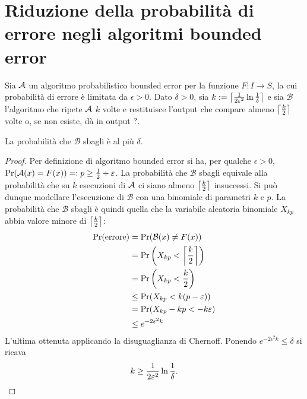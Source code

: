 %
%
%
%


\section{Riduzione della probabilità di errore negli algoritmi bounded error}
\newcommand{\Balg}{\mathcal B}

Sia $\Aalg$ un algoritmo probabilistico bounded error per la funzione $F:I\to S$, la cui probabilità di errore è limitata da $\epsilon>0$.
Dato $\delta>0$, sia $k:=\ceil{\frac{1}{2\epsilon^2}\ln\frac{1}{\delta}}$ e sia $\Balg$ l'algoritmo che ripete $\Aalg$ $k$ volte e restituisce l'output che compare almeno $\ceil{\frac k2}$ volte o, se non esiste, dà in output $?$.

\begin{thm}
	La probabilità che $\Balg$ sbagli è al più $\delta$.
\end{thm}
\begin{proof}
	Per definizione di algoritmo bounded error si ha, per qualche $\epsilon>0$, $\Pr(\Aalg(x)=F(x))=:p\ge\frac 12+\epsilon$.
	La probabilità che $\Balg$ sbagli equivale alla probabilità che su $k$ esecuzioni di $\Aalg$ ci siano almeno $\ceil{\frac k2}$ insuccessi.
	Si può dunque modellare l'esecuzione di $\Balg$ con una binomiale di parametri $k$ e $p$. La probabilità che $\Balg$ sbagli è quindi quella che la variabile aleatoria binomiale $X_{kp}$ abbia valore minore di $\ceil{\frac k2}$:
	\begin{align*}
		\Pr(\text{errore}) & = \Pr(\Balg(x)\ne F(x))                  \\
		                   & = \Pr\left(X_{kp}<\ceil{\frac k2}\right) \\
		                   & = \Pr\left(X_{kp}<\frac k2\right)        \\
		                   & \le \Pr(X_{kp}<k(p-\epsilon))            \\
		                   & = \Pr(X_{kp}-kp<-k\epsilon)              \\
		                   & \le e^{-2\epsilon^2 k}
	\end{align*}
	L'ultima ottenuta applicando la disuguaglianza di Chernoff. Ponendo $e^{-2\epsilon^2 k}\le\delta$ si ricava
	\begin{equation*}
		k\ge\frac{1}{2\epsilon^2}\ln\frac{1}{\delta} \text. \qedhere
	\end{equation*}
\end{proof}
